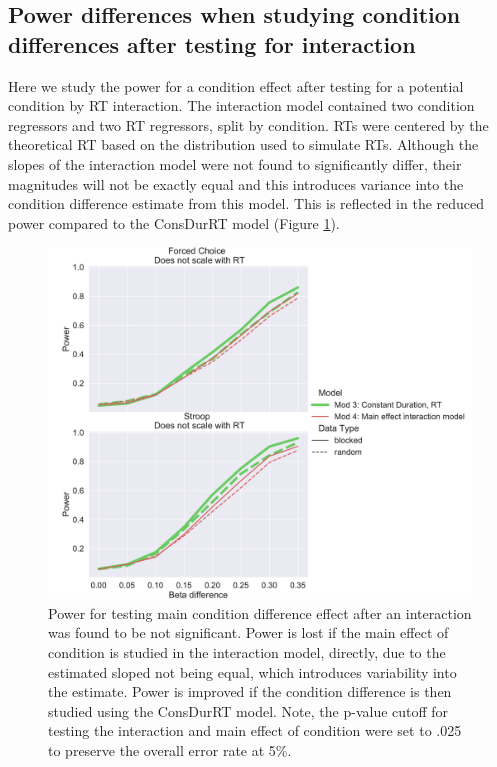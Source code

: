 \documentclass[titlepage,12pt] {article}
\begin{document}
\subsection*{Power differences when studying condition differences after testing for interaction}
Here we study the power for a condition effect after testing for a potential condition by RT interaction.  The interaction model contained two condition regressors and two RT regressors, split by condition. RTs were centered by the theoretical RT based on the distribution used to simulate RTs.  Although the slopes of the interaction model were not found to significantly differ, their magnitudes will not be exactly equal and this introduces variance into the condition difference estimate from this model.  This is reflected in the reduced power compared to the ConsDurRT model (Figure \ref{fig:pow-int}).
\begin{figure}[h!]
  \centering
   \includegraphics[width=5in]{Figures/power_24_rtdiff_1_interaction.pdf}
   \caption{Power for testing main condition difference effect after an interaction was found to be not significant.  Power is lost if the main effect of condition is studied in the interaction model, directly, due to the estimated sloped not being equal, which introduces variability into the estimate.  Power is improved if the condition difference is then studied using the ConsDurRT model.  Note, the p-value cutoff for testing the interaction and main effect of condition were set to .025 to preserve the overall error rate at 5\%.}
  \label{fig:pow-int}
\end{figure}
\end{document}
